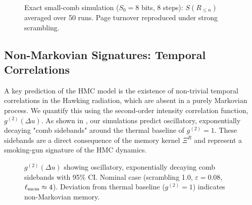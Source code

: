 \documentclass[aps,prd,preprint,onecolumn,superscriptaddress,nofootinbib,longbibliography,floatfix,11pt,showpacs,showkeys]{revtex4-2}
\newcommand{\HMC}{\textsc{HMC}\xspace}
\theoremstyle{plain}
\theoremstyle{definition}
\theoremstyle{remark}
\begin{document}
\begin{figure}[htbp]
    \centering
  \caption{Exact small-comb simulation ($S_0=8$ bits, 8 steps): $S(R_{\le n})$ averaged over 50 runs. Page turnover reproduced under strong scrambling.}
    \label{fig:page_curve_exact}
\end{figure}

\subsection{Non-Markovian Signatures: Temporal Correlations}
A key prediction of the \HMC{} model is the existence of non-trivial temporal correlations in the Hawking radiation, which are absent in a purely Markovian process. We quantify this using the second-order intensity correlation function, $g^{(2)}(\Delta u)$. As shown in , our simulations predict oscillatory, exponentially decaying "comb sidebands" around the thermal baseline of $g^{(2)}=1$. These sidebands are a direct consequence of the memory kernel $\Xi^R$ and represent a smoking-gun signature of the \HMC{} dynamics.

\begin{figure}[htbp]
\centering
{}
\caption{$g^{(2)}(\Delta u)$ showing oscillatory, exponentially decaying comb sidebands with 95\% CI. Nominal case (scrambling 1.0, $\varepsilon=0.08$, $\ell_{\rm mem} \approx 4$). Deviation from thermal baseline ($g^{(2)}=1$) indicates non-Markovian memory.}
\label{fig:g2}
\end{figure}
\end{document}
